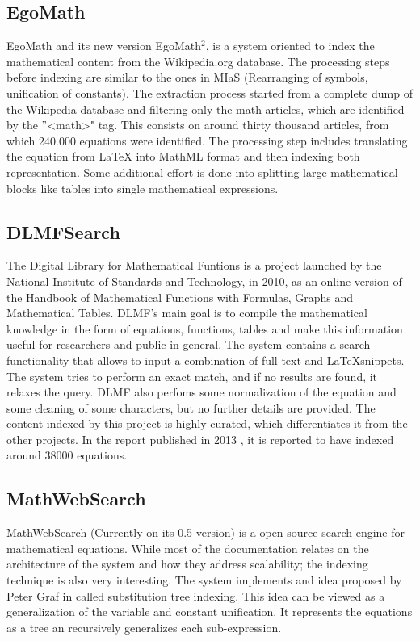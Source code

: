 \subsection{EgoMath}
EgoMath\cite{egomath1} and its new version EgoMath$^2$\cite{egomath2}, is a system oriented to index the mathematical content from the Wikipedia.org database. The processing steps before indexing are similar to the ones in MIaS (Rearranging of symbols, unification of constants). The extraction process started from a complete dump of the Wikipedia database and filtering only the math articles, which are identified by the ”<math>" tag. This consists on around thirty thousand articles, from which 240.000 equations were identified. The processing step includes translating the equation from LaTeX into MathML format and then indexing both representation.
Some additional effort is done into splitting large mathematical blocks like tables into single mathematical expressions.

\subsection{DLMFSearch}
The Digital Library for Mathematical Funtions \cite{dlmf} is a project launched by the National Institute of Standards and Technology, in 2010, as an online version of the  Handbook of Mathematical Functions with Formulas, Graphs and Mathematical Tables\cite{handbook}. DLMF's main goal is to compile the mathematical knowledge in the form of equations, functions, tables and make this information useful for researchers and public in general. The system contains a search functionality that allows to input a combination of full text and \LaTeX snippets. The system tries to perform an exact match, and if no results are found, it relaxes the query. DLMF also perfoms some normalization of the equation and some cleaning of some characters, but no further details are provided. The content indexed by this project is highly curated, which differentiates it from the other projects. In the report published in 2013 \cite{dlmf2}, it is reported to have indexed around 38000 equations. 

\subsection{MathWebSearch}
MathWebSearch\cite{mathwebsearch} (Currently on its 0.5 version) is a open-source search engine for mathematical equations. While most of the documentation relates on the architecture of the system and how they address scalability; the indexing technique is also very interesting. The system implements and idea proposed by Peter Graf in \cite{substitution_tree_indexing} called substitution tree indexing. This idea can be viewed as a generalization of the variable and constant unification. It represents the equations as a tree an recursively generalizes each sub-expression.


